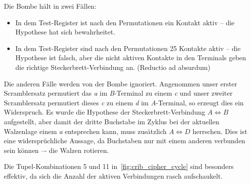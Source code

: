 Die Bombe hält in zwei Fällen:
\begin{itemize}
	\item In dem Test-Register ist nach den Permutationen ein Kontakt aktiv – die Hypothese hat sich bewahrheitet.
	\item In dem Test-Register sind nach den Permutationen 25 Kontakte aktiv – die Hypothese ist falsch, aber die nicht aktiven Kontakte in den Terminals geben die \glqq richtige\grqq{} Steckerbrett-Verbindung an. (Reductio ad absurdum)
\end{itemize}

Die anderen Fälle werden von der Bombe ignoriert.
Angenommen unser erster Scramblersatz permutiert das \emph{a} im \emph{B}-Terminal zu einem \emph{c} und unser zweiter Scramblersatz permutiert dieses \emph{c} zu einem \emph{d} im \emph{A}-Terminal, so erzeugt dies ein Widerspruch.
Es wurde die Hypothese der Steckerbrett-Verbindung $A \Leftrightarrow B$ aufgestellt, aber damit der dritte Buchstabe im Zyklus bei der aktuellen Walzenlage einem \emph{a} entsprechen kann, muss zusätzlich $A \Leftrightarrow D$ herrschen.
Dies ist eine widersprüchliche Aussage, da Buchstaben nur mit einem anderen verbunden sein können –- die Walzen rotieren.

Die Tupel-Kombinationen 5 und 11 in~\cref{fig:crib_cipher_cycle} sind besonders effektiv, da sich die Anzahl der aktiven Verbindungen rasch \glqq aufschaukelt\grqq.



